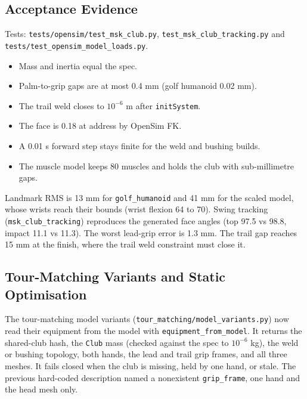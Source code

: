 \documentclass[11pt,a4paper]{article}
\begin{document}
\subsection{Acceptance Evidence}
Tests: \texttt{tests/opensim/test\_msk\_club.py},
\texttt{test\_msk\_club\_tracking.py} and
\texttt{tests/test\_opensim\_model\_loads.py}.
\begin{itemize}
\item Mass and inertia equal the spec.
\item Palm-to-grip gaps are at most 0.4 mm (golf humanoid 0.02 mm).
\item The trail weld closes to $10^{-6}$ m after \texttt{initSystem}.
\item The face is 0.18\textdegree{} at address by OpenSim FK.
\item A 0.01 s forward step stays finite for the weld and bushing builds.
\item The muscle model keeps 80 muscles and holds the club with
  sub-millimetre gaps.
\end{itemize}
Landmark RMS is 13 mm for \texttt{golf\_humanoid} and 41 mm for the scaled
model, whose wrists reach their bounds (wrist flexion 64 to 70\textdegree).
Swing tracking (\texttt{msk\_club\_tracking}) reproduces the generated face
angles (top 97.5 vs 98.8\textdegree, impact 11.1 vs 11.3\textdegree).
The worst lead-grip error is 1.3 mm. The trail gap reaches 15 mm at the
finish, where the trail weld constraint must close it.

\subsection{Tour-Matching Variants and Static Optimisation}
The tour-matching model variants (\texttt{tour\_matching/model\_variants.py})
now read their equipment from the model with \texttt{equipment\_from\_model}.
It returns the shared-club hash, the \texttt{Club} mass (checked against the
spec to $10^{-6}$ kg), the weld or bushing topology, both hands, the lead and
trail grip frames, and all three meshes. It fails closed when the club is
missing, held by one hand, or stale. The previous hard-coded description named
a nonexistent \texttt{grip\_frame}, one hand and the head mesh only.
\end{document}
